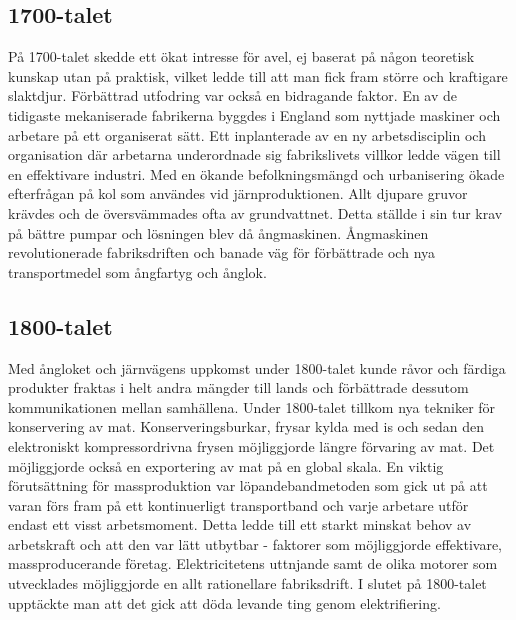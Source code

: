 \subsection{1700-talet}
På 1700-talet skedde ett ökat intresse för avel, ej baserat på någon teoretisk kunskap utan på praktisk, vilket ledde till att man fick fram större och kraftigare slaktdjur. Förbättrad utfodring var också en bidragande faktor. \citep{denskapande}
\newline
\newline
En av de tidigaste mekaniserade fabrikerna byggdes i England som nyttjade maskiner och arbetare på ett organiserat sätt. Ett inplanterade av en ny arbetsdisciplin och organisation där arbetarna underordnade sig fabrikslivets villkor ledde vägen till en effektivare industri. \citep{denskapande}
\newline
\newline
Med en ökande befolkningsmängd och urbanisering ökade efterfrågan på kol som användes vid järnproduktionen. Allt djupare gruvor krävdes och de översvämmades ofta av grundvattnet. Detta ställde i sin tur krav på bättre pumpar och lösningen blev då ångmaskinen. \citep{industriell}
\newline
\newline
Ångmaskinen revolutionerade fabriksdriften och banade väg för förbättrade och nya transportmedel som ångfartyg och ånglok. \citep{denskapande}

\subsection{1800-talet}
Med ångloket och järnvägens uppkomst under 1800-talet kunde råvor och färdiga produkter fraktas i helt andra mängder till lands och förbättrade dessutom kommunikationen mellan samhällena. \citep{denskapande}
\newline
\newline
Under 1800-talet tillkom nya tekniker för konservering av mat. Konserveringsburkar, frysar kylda med is och sedan den elektroniskt kompressordrivna frysen möjliggjorde längre förvaring av mat. \citep{denskapande} 
\newline
Det möjliggjorde också en exportering av mat på en global skala. \citep{edgerton}
\newline
\newline
En viktig förutsättning för massproduktion var löpandebandmetoden som gick ut på att varan förs fram på ett kontinuerligt transportband och varje arbetare utför endast ett visst arbetsmoment. Detta ledde till ett starkt minskat behov av arbetskraft och att den var lätt utbytbar - faktorer som möjliggjorde effektivare, massproducerande företag. \citep{denskapande}
\newline
\newline
Elektricitetens uttnjande samt de olika motorer som utvecklades möjliggjorde en allt rationellare fabriksdrift. \citep{denskapande}
\newline
\newline
I slutet på 1800-talet upptäckte man att det gick att döda levande ting genom elektrifiering. \citep{edgerton}

